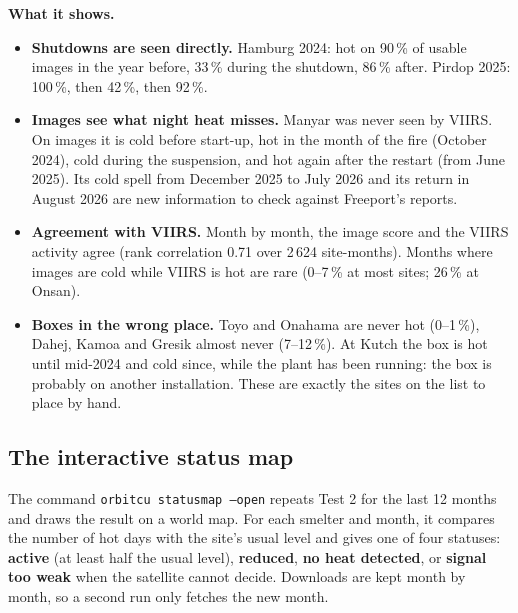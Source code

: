 \documentclass[10pt,a4paper]{article}
\newcommand{\code}[1]{\texttt{\small #1}}
\begin{document}
\textbf{What it shows.}
\begin{itemize}[leftmargin=1.2em]
  \item \textbf{Shutdowns are seen directly.} Hamburg 2024: hot on 90\,\% of usable images in the year before, 33\,\% during the shutdown, 86\,\% after. Pirdop 2025: 100\,\%, then 42\,\%, then 92\,\%.
  \item \textbf{Images see what night heat misses.} Manyar was never seen by VIIRS. On images it is cold before start-up, hot in the month of the fire (October 2024), cold during the suspension, and hot again after the restart (from June 2025). Its cold spell from December 2025 to July 2026 and its return in August 2026 are new information to check against Freeport's reports.
  \item \textbf{Agreement with VIIRS.} Month by month, the image score and the VIIRS activity agree (rank correlation 0.71 over 2\,624 site-months). Months where images are cold while VIIRS is hot are rare (0--7\,\% at most sites; 26\,\% at Onsan).
  \item \textbf{Boxes in the wrong place.} Toyo and Onahama are never hot (0--1\,\%), Dahej, Kamoa and Gresik almost never (7--12\,\%). At Kutch the box is hot until mid-2024 and cold since, while the plant has been running: the box is probably on another installation. These are exactly the sites on the list to place by hand.
\end{itemize}

\subsection{The interactive status map}
The command \code{orbitcu statusmap --open} repeats Test 2 for the last 12 months and draws the result on a world map. For each smelter and month, it compares the number of hot days with the site's usual level and gives one of four statuses: \textbf{active} (at least half the usual level), \textbf{reduced}, \textbf{no heat detected}, or \textbf{signal too weak} when the satellite cannot decide. Downloads are kept month by month, so a second run only fetches the new month.
\end{document}
